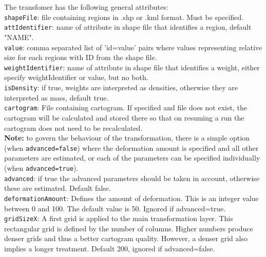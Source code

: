 \documentclass{article}
\begin{document}
The transfomer has the following general attributes:\\

{\tt shapeFile}: file containing regions in .shp or .kml format. Must be specified.\\

{\tt attIdentifier}: name of attribute in shape file that identifies a region, default "NAME".\\

{\tt value}: comma separated list of 'id=value' pairs where values representing relative size for each regions with ID from the shape file.\\

{\tt weightIdentifier}: name of attribute in shape file that identifies a weight, either specify weightIdentifier or value, but no both.\\

{\tt isDensity}: if true, weights are interpreted as densities, otherwise they are interpreted as mass, default true.\\

{\tt cartogram}: File containing cartogram. If specified and file does not exist, the cartogram will be calculated and stored there so that on resuming a run the cartogram does not need to be recalculated.\\

{\bf Note:} to govern the behaviour of the transformation, there is a simple option (when {\tt advanced=false}) where the deformation amount is specified and all other parameters are estimated, or each of the parameters can be specified individually (when {\tt advanced=true}).\\

{\tt advanced}: if true the advanced parameters should be taken in account, otherwise these are estimated. Default false.\\

{\tt deformationAmount}: Defines the amount of deformation. This is an integer value between 0 and 100. The default value is 50. Ignored if advanced=true.\\

{\tt gridSizeX}: A first grid is applied to the main transformation layer. 
This rectangular grid is defined by the number of columns. 
Higher numbers produce denser grids and thus a better cartogram quality. 
However, a denser grid also implies a longer treatment. 
Default 200, ignored if advanced=false.\\
\end{document}
